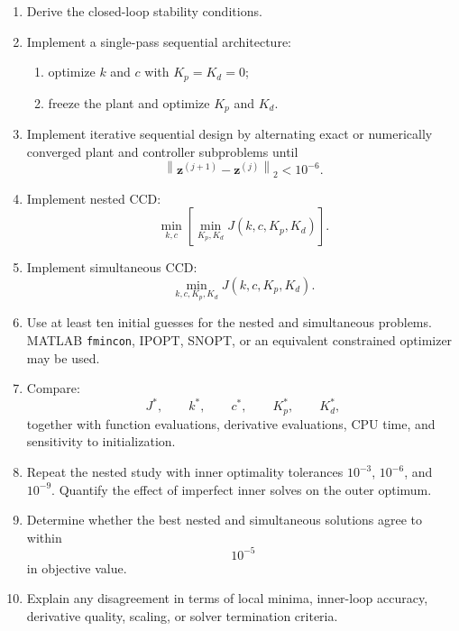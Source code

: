 \begin{enumerate}
    \item Derive the closed-loop stability conditions.

    \item Implement a single-pass sequential architecture:
    \begin{enumerate}
        \item optimize $k$ and $c$ with $K_p=K_d=0$;
        \item freeze the plant and optimize $K_p$ and $K_d$.
    \end{enumerate}

    \item Implement iterative sequential design by alternating exact or
    numerically converged plant and controller subproblems until
    \begin{equation}
    \left\|
    \mathbf{z}^{(j+1)}-\mathbf{z}^{(j)}
    \right\|_2
    <10^{-6}.
    \end{equation}

    \item Implement nested CCD:
    \begin{equation}
    \min_{k,c}
    \left[
    \min_{K_p,K_d}
    J(k,c,K_p,K_d)
    \right].
    \end{equation}

    \item Implement simultaneous CCD:
    \begin{equation}
    \min_{k,c,K_p,K_d}
    J(k,c,K_p,K_d).
    \end{equation}

    \item Use at least ten initial guesses for the nested and simultaneous
    problems. MATLAB \texttt{fmincon}, IPOPT, SNOPT, or an equivalent
    constrained optimizer may be used.

    \item Compare:
    \begin{equation}
    J^*,
    \qquad
    k^*,
    \qquad
    c^*,
    \qquad
    K_p^*,
    \qquad
    K_d^*,
    \end{equation}
    together with function evaluations, derivative evaluations, CPU time,
    and sensitivity to initialization.

    \item Repeat the nested study with inner optimality tolerances
    $10^{-3}$, $10^{-6}$, and $10^{-9}$. Quantify the effect of imperfect
    inner solves on the outer optimum.

    \item Determine whether the best nested and simultaneous solutions agree
    to within
    \begin{equation}
    10^{-5}
    \end{equation}
    in objective value.

    \item Explain any disagreement in terms of local minima, inner-loop
    accuracy, derivative quality, scaling, or solver termination criteria.
\end{enumerate}
